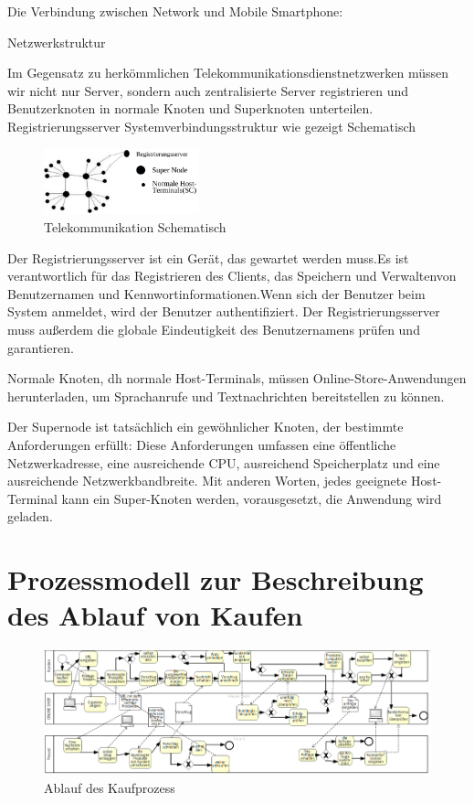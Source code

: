 Die Verbindung zwischen Network und Mobile Smartphone:

Netzwerkstruktur

Im Gegensatz zu herkömmlichen Telekommunikationsdienstnetzwerken müssen wir nicht nur Server, sondern auch zentralisierte Server registrieren und Benutzerknoten in normale Knoten und Superknoten unterteilen. Registrierungsserver Systemverbindungsstruktur wie gezeigt Schematisch

\begin{figure}[htbp]
	\centering
	\includegraphics[width=0.4\textwidth]{bilder/telekommunikation-schema.png}
	\caption{Telekommunikation Schematisch}
	\label{fig:telekommunikation}
\end{figure}

Der Registrierungsserver ist ein Gerät, das gewartet werden muss.Es ist verantwortlich für das Registrieren des Clients, das Speichern und Verwaltenvon Benutzernamen und Kennwortinformationen.Wenn sich der Benutzer beim System anmeldet, wird der Benutzer authentifiziert. Der Registrierungsserver muss außerdem die globale Eindeutigkeit des Benutzernamens prüfen und garantieren.

Normale Knoten, dh normale Host-Terminals, müssen Online-Store-Anwendungen herunterladen, um Sprachanrufe und Textnachrichten bereitstellen zu können.

Der Supernode ist tatsächlich ein gewöhnlicher Knoten, der bestimmte Anforderungen erfüllt: Diese Anforderungen umfassen eine öffentliche Netzwerkadresse, eine ausreichende CPU, ausreichend Speicherplatz und eine ausreichende Netzwerkbandbreite. Mit anderen Worten, jedes geeignete Host-Terminal kann ein Super-Knoten werden, vorausgesetzt, die Anwendung wird geladen.


\section{Prozessmodell zur Beschreibung des Ablauf von Kaufen}

\begin{figure}[htbp]
	\centering
	\includegraphics[width=1\textwidth]{bilder/bpmn-ablauf-kaufen.png}
	\caption{Ablauf des Kaufprozess}
	\label{fig:bpmn-ablauf-kaufen}
\end{figure}


